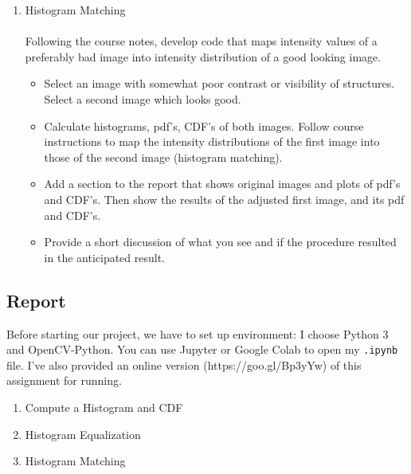 \documentclass{article}
\begin{document}
\begin{enumerate}[label=B\arabic*)]
	\item Histogram Matching
		\\
		\\
		Following the course notes, develop code that maps intensity values of a preferably bad image into intensity distribution of a good looking image.
		\begin{itemize}
			\item Select an image with somewhat poor contrast or visibility of structures. Select a second image which looks good.
			\item Calculate histograms, pdf’s, CDF’s of both images. Follow course instructions to map the intensity distributions of the first image into those of the second image (histogram matching).
			\item Add a section to the report that shows original images and plots of pdf’s and CDF’s. Then show the results of the adjusted first image, and its pdf and CDF’s.
			\item Provide a short discussion of what you see and if the procedure resulted in the anticipated result.
		\end{itemize}		
\end{enumerate}

\pagebreak

\subsection{Report}
Before starting our project, we have to set up environment: I choose Python 3 and OpenCV-Python. You can use Jupyter or Google Colab to open my \texttt{.ipynb} file. I've also provided an online version (https://goo.gl/Bp3yYw) of this assignment for running.

\begin{enumerate}[label=B\arabic*)]
	\item Compute a Histogram and CDF 
		
	\item Histogram Equalization 
				
	\item Histogram Matching
		
\end{enumerate}
\end{document}
